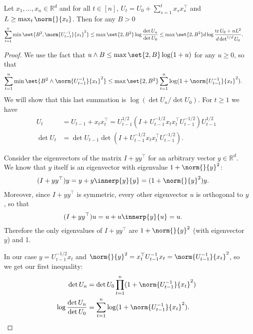 \documentclass{article}
\newcommand{\inv}[1]{#1^{-1}}
\newcommand{\Real}{\mathds{R}}
\DeclareMathOperator{\tr}{tr}
\providecommand\transp{\top}
\let\transpsymbol\transp
\renewcommand{\transp}[1]{#1^\transpsymbol}
\begin{document}
\begin{lemma}\label{lemma:elliptical-potential}
  Let $x_1,\dotsc,x_n \in \Real^d$ and for all $t\in[n]$,
  $U_t = U_0 + \sum_{s=1}^t x_s \transp{x_s}$ and
  $L \ge \max_t\norm{}{x_t}$. Then for any $B > 0$
  \begin{align*}
    \sum_{t=1}^n\min\set{B^2, \norm{\inv{U_{t-1}}}{x_t}^2}
    &\le \max\set{2, B^2}\log\frac{\det U_n}{\det U_0}
      \le \max\set{2, B^2} d\log\frac{\tr U_0+nL^2}{d\det^{1/d} U_0}.
  \end{align*}

  \begin{proof}
    We use the fact that $u \wedge B \le \max\set{2, B}\log(1+u)$ for
    any $u \ge 0$, so that
    \begin{align*}
      \sum_{t=1}^n\min\set{B^2 \wedge \norm{\inv{U_{t-1}}}{x_t}^2}
      &\le \max\set{2, B^2} \sum_{t=1}^n \log(1 + \norm{\inv{U_{t-1}}}{x_t}^2).
    \end{align*}
    We will show that this last summation is $\log(\det U_n/\det
    U_0)$.  For $t \ge 1$ we have
    \begin{align*}
      U_t &= U_{t-1} + x_t\transp{x_t}
           = U_{t-1}^{1/2} (I + U_{t-1}^{-1/2}x_t\transp{x_t}U_{t-1}^{-1/2}) U_{t-1}^{1/2} \\
      \det U_t &= \det U_{t-1}\det(I + U_{t-1}^{-1/2}x_t\transp{x_t}U_{t-1}^{-1/2}).
    \end{align*}

    Consider the eigenvectors of the matrix $I+y\transp{y}$ for an
    arbitrary vector $y\in\Real^d$.  We know that $y$ itself is an
    eigenvector with eigenvalue $1+\norm{}{y}^2$:
    \begin{align*}
      (I + y\transp{y})y &= y + y\innerp{y}{y} = (1+\norm{}{y}^2)y.
    \end{align*}
    Moreover, since $I+y\transp{y}$ is symmetric, every other
    eigenvector $u$ is orthogonal to $y$, so that
    \begin{align*}
      (I + y\transp{y})u &= u + u\innerp{y}{u} = u.
    \end{align*}
    Therefore the only eigenvalues of $I+y\transp{y}$ are
    $1+\norm{}{y}^2$ (with eigenvector $y$) and 1.

    In our case $y = U_{t-1}^{-1/2}x_t$ and $\norm{}{y}^2 =
    \transp{x_t}\inv{U_{t-1}}x_t = \norm{\inv{U_{t-1}}}{x_t}^2$, so we get our
    first inequality:
    \begin{align*}
      \det U_n &= \det U_0 \prod_{t=1}^n(1 + \norm{\inv{U_{t-1}}}{x_t}^2) \\
      \log\frac{\det U_n}{\det U_0} &= \sum_{t=1}^n\log(1+\norm{\inv{U_{t-1}}}{x_t}^2).
    \end{align*}


\end{proof}
\end{lemma}
\end{document}
